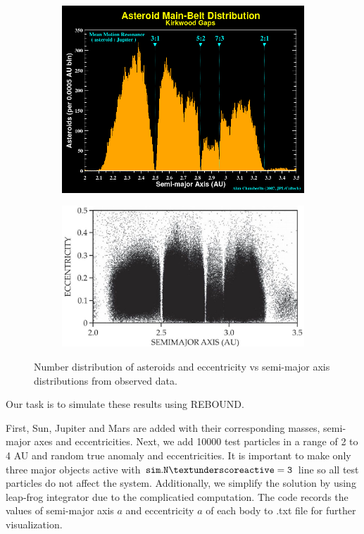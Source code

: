 \documentclass[12pt,a4paper]{article}
\begin{document}
\begin{figure}[H]
  \centering
  \begin{subfigure}{0.49\textwidth}
    \centering
    \includegraphics[width=\linewidth]{kirkwood/kirkwood.png}
  \end{subfigure}
  \begin{subfigure}{0.49\textwidth}
    \centering
    \includegraphics[width=\linewidth]{kirkwood/eccentricity_semimajor.jpeg}
  \end{subfigure}
  \caption{Number distribution of asteroids and eccentricity vs semi-major axis distributions from observed data.}
  \label{fig:real_kirkwood}
\end{figure}

Our task is to simulate these results using REBOUND.

First, Sun, Jupiter and Mars are added with their corresponding masses, semi-major axes and eccentricities. 
Next, we add 10000 test particles in a range of 2 to 4 AU and random true anomaly and eccentricities. It is important to make only three major objects active with $\tt sim.N\textunderscore active=3$ line so all test particles do not affect the system. 
Additionally, we simplify the solution by using leap-frog integrator due to the complicatied computation. The code records the values of semi-major axis $a$ and eccentricity $a$ of each body to .txt file for further visualization.
\end{document}

